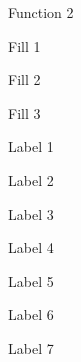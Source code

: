 \documentclass[10pt,english,twocolumn,fleqn]{extarticle}
\begin{document}
\begin{figure}
\centering

\par
\caption{Function 2}
\end{figure}


\begin{figure}
\centering

\par
\caption{Fill 1}
\end{figure}

\begin{figure}
\centering

\par
\caption{Fill 2}
\end{figure}

\begin{figure}
\centering

\par
\caption{Fill 3}
\end{figure}

\begin{figure}
\centering

\par
\caption{Label 1}
\end{figure}

\begin{figure}
\centering

\par
\caption{Label 2}
\end{figure}

\begin{figure}
\centering

\par
\caption{Label 3}
\end{figure}

\begin{figure}
\centering

\par
\caption{Label 4}
\end{figure}

\begin{figure}
\centering

\par
\caption{Label 5}
\end{figure}

\begin{figure}
\centering

\par
\caption{Label 6}
\end{figure}

\begin{figure}
\centering

\par
\caption{Label 7}
\end{figure}
\end{document}

